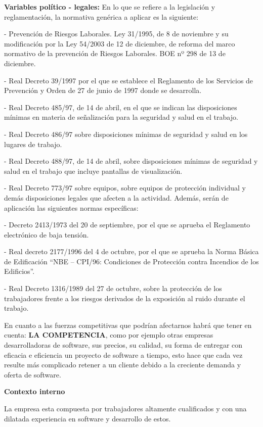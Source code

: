 \documentclass[10pt,a4paper]{article}
\begin{document}
\begin{enumerate}
\textbf{Variables político - legales: }En lo que se refiere a la legislación y reglamentación, la normativa genérica a aplicar es la siguiente: 

- Prevención de Riesgos Laborales. Ley 31/1995, de 8 de noviembre y su modificación por la Ley 54/2003 de 12 de diciembre, de reforma del marco normativo de la prevención de Riesgos Laborales. BOE nº 298 de 13 de diciembre.

- Real Decreto 39/1997 por el que se establece el Reglamento de los Servicios de Prevención y Orden de 27 de junio de 1997 donde se desarrolla.

- Real Decreto 485/97, de 14 de abril, en el que se indican las disposiciones mínimas en materia de señalización para la seguridad y salud en el trabajo.

- Real Decreto 486/97 sobre disposiciones mínimas de seguridad y salud en los lugares de trabajo.

- Real Decreto 488/97, de 14 de abril, sobre disposiciones mínimas de seguridad y salud en el trabajo que incluye pantallas de visualización.

- Real Decreto 773/97 sobre equipos, sobre equipos de protección individual y demás disposiciones legales que afecten a la actividad. Además, serán de aplicación las siguientes normas específicas:

- Decreto 2413/1973 del 20 de septiembre, por el que se aprueba el Reglamento electrónico de baja tensión. 

- Real decreto 2177/1996 del 4 de octubre, por el que se aprueba la Norma Básica de Edificación “NBE – CPI/96: Condiciones de Protección contra Incendios de los Edificios”. 

- Real Decreto 1316/1989 del 27 de octubre, sobre la protección de los trabajadores frente a los riesgos derivados de la exposición al ruido durante el trabajo.

En cuanto a las fuerzas competitivas que podrían afectarnos habrá que tener en cuenta: \textbf{LA COMPETENCIA}, como por ejemplo otras empresas desarrolladoras de software, sus precios, su calidad, su forma de entregar con eficacia e eficiencia un proyecto de software a tiempo, esto hace que cada vez resulte más complicado retener a un cliente debido a la creciente demanda y oferta de software.

\textbf{Contexto interno}

La empresa esta compuesta por trabajadores altamente cualificados y con una dilatada experiencia en software y desarrollo de estos.


\end{enumerate}
\end{document}
